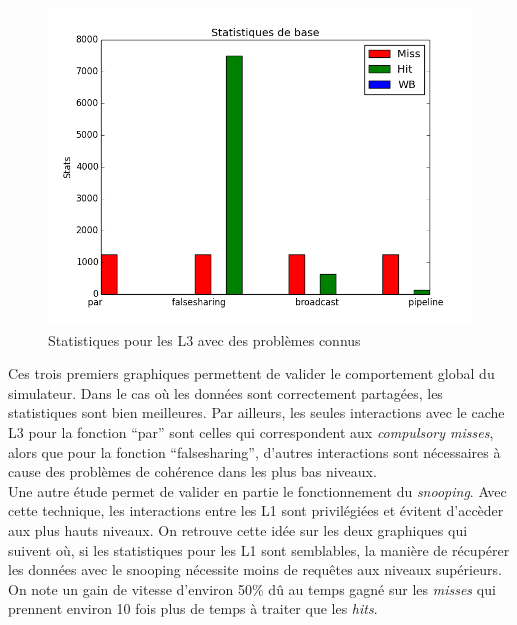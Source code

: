 \begin{figure}[H]
\begin{center}
   \includegraphics[scale=0.35]{images/stats_L3.png}
   \caption{\label{img:inclusifs} Statistiques pour les L3 avec des problèmes connus}
\end{center}
\end{figure}

Ces trois premiers graphiques permettent de valider le comportement global du simulateur. Dans le cas où les données sont correctement partagées, les statistiques sont bien meilleures. Par ailleurs, les seules interactions avec le cache L3 pour la fonction ``par'' sont celles qui correspondent aux \emph{compulsory misses}, alors que pour la fonction ``falsesharing'', d'autres interactions sont nécessaires à cause des problèmes de cohérence dans les plus bas niveaux. \\

Une autre étude permet de valider en partie le fonctionnement du \emph{snooping}. Avec cette technique, les interactions entre les L1 sont privilégiées et évitent d'accèder aux plus hauts niveaux. On retrouve cette idée sur les deux graphiques qui suivent où, si les statistiques pour les L1 sont semblables, la manière de récupérer les données avec le snooping nécessite moins de requêtes aux niveaux supérieurs. On note un gain de vitesse d'environ 50\% dû au temps gagné sur les \emph{misses} qui prennent environ 10 fois plus de temps à traiter que les \emph{hits}.\\

